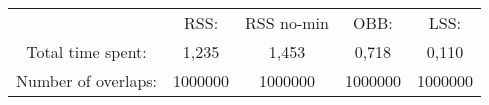 \begin{tabular}{c|c|c|c|c}\\ 
& RSS: & RSS no-min & OBB: & LSS:\\ 
Total time spent: & 1,235 & 1,453 & 0,718 & 0,110\\ 
Number of overlaps: &1000000 & 1000000 & 1000000 & 1000000\\ 
\end{tabular}